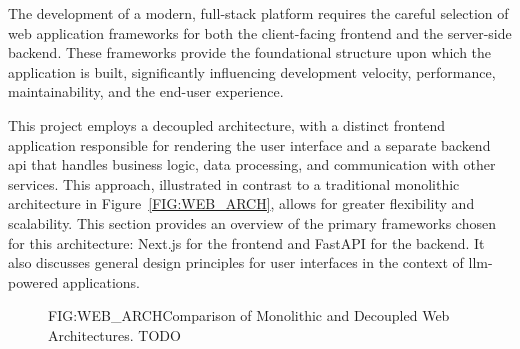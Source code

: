 The development of a modern, full-stack platform requires the careful selection of web application frameworks for both the client-facing frontend and the server-side backend. These frameworks provide the foundational structure upon which the application is built, significantly influencing development velocity, performance, maintainability, and the end-user experience.

This project employs a decoupled architecture, with a distinct frontend application responsible for rendering the user interface and a separate backend \acs{api} that handles business logic, data processing, and communication with other services. This approach, illustrated in contrast to a traditional monolithic architecture in Figure~\ref{FIG:WEB_ARCH}, allows for greater flexibility and scalability. This section provides an overview of the primary frameworks chosen for this architecture: Next.js for the frontend and FastAPI for the backend. It also discusses general design principles for user interfaces in the context of \ac{llm}-powered applications.

\begin{figure}[Comparison of Monolithic and Decoupled Web Architectures]{FIG:WEB_ARCH}{Comparison of Monolithic and Decoupled Web Architectures. TODO}
    \centering
    
\end{figure}